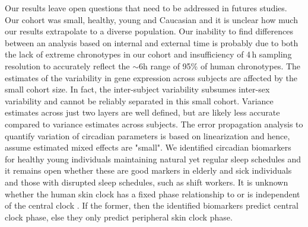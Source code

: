 Our results leave open questions that need to be addressed in futures studies. Our cohort was small, healthy, young and Caucasian and it is unclear how much our results extrapolate to a diverse population. Our inability to find differences between an analysis based on internal and external time is probably due to both the lack of extreme chronotypes in our cohort and insufficiency of 4\,h sampling resolution to accurately reflect the $\sim$6h range of 95\% of human chronotypes. The estimates of the variability in gene expression across subjects are affected by the small cohort size. In fact, the inter-subject variability subsumes inter-sex variability and cannot be reliably separated in this small cohort. Variance estimates across just two layers are well defined, but are likely less accurate compared to variance estimates across subjects. The error propagation analysis to quantify variation of circadian parameters is based on linearization and hence, assume estimated mixed effects are "small". We identified circadian biomarkers for healthy young individuals maintaining natural yet regular sleep schedules and it remains open whether these are good markers in elderly and sick individuals and those with disrupted sleep schedules, such as shift workers. It is unknown whether the human skin clock has a fixed phase relationship to or is independent of the central clock \cite{Welz2019}. If the former, then the identified biomarkers predict central clock phase, else they only predict peripheral skin clock phase.

